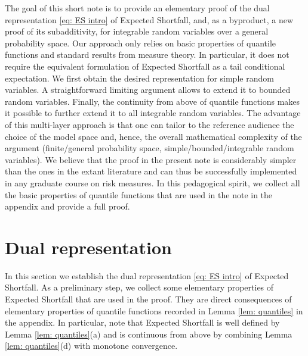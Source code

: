 \documentclass[12pt]{article}
\theoremstyle{plain}
\theoremstyle{definition}
\theoremstyle{remark}
\numberwithin{equation}{section}
\begin{document}
\smallskip

The goal of this short note is to provide an elementary proof of the dual representation \eqref{eq: ES intro} of Expected Shortfall, and, as a byproduct, a new proof of its subadditivity, for integrable random variables over a general probability space. Our approach only relies on basic properties of quantile functions and standard results from measure theory. In particular, it does not require the equivalent formulation of Expected Shortfall as a tail conditional expectation. We first obtain the desired representation for simple random variables. A straightforward limiting argument allows to extend it to bounded random variables. Finally, the continuity from above of quantile functions makes it possible to further extend it to all integrable random variables. The advantage of this multi-layer approach is that one can tailor to the reference audience the choice of the model space and, hence, the overall mathematical complexity of the argument (finite/general probability space, simple/bounded/integrable random variables). We believe that the proof in the present note is considerably simpler than the ones in the extant literature and can thus be successfully implemented in any graduate course on risk measures. In this pedagogical spirit, we collect all the basic properties of quantile functions that are used in the note in the appendix and provide a full proof.


\section{Dual representation}
\label{sect: dual representation}

In this section we establish the dual representation \eqref{eq: ES intro} of Expected Shortfall. As a preliminary step, we collect some elementary properties of Expected Shortfall that are used in the proof. They are direct consequences of elementary properties of quantile functions recorded in Lemma \ref{lem: quantiles} in the appendix. In particular, note that Expected Shortfall is well defined by Lemma \ref{lem: quantiles}(a) and is continuous from above by combining Lemma \ref{lem: quantiles}(d) with monotone convergence.
\end{document}
